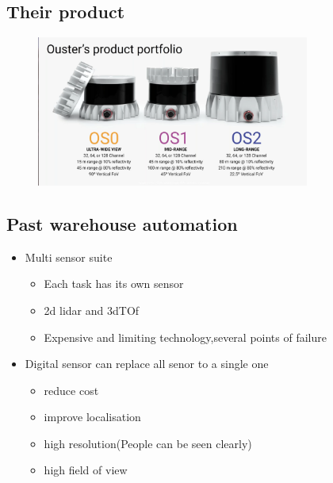 \documentclass[a4paper]{article}
\begin{document}
\subsection{Their product}
\begin{figure}[htpb]
	\centering
	\includegraphics[width=0.8\textwidth]{ousterproducts.png}
	\caption{}
	\label{fig:}
\end{figure}
\subsection{Past warehouse automation}
\begin{itemize}
	\item Multi sensor suite
	      \begin{itemize}
		      \item Each task has its own sensor
		      \item 2d lidar and 3dTOf
		      \item Expensive and limiting technology,several points of failure
	      \end{itemize}
	\item Digital sensor can replace all senor to a single one
	      \begin{itemize}
		      \item reduce cost
		      \item improve localisation
		      \item high resolution(People can be seen clearly)
		      \item high field of view
	      \end{itemize}
\end{itemize}
\end{document}
